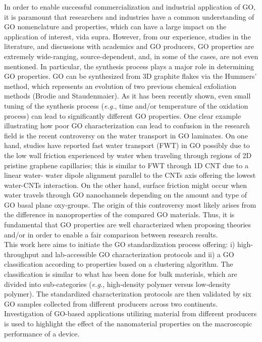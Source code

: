 In order to enable successful commercialization and industrial application of GO, it is paramount that researchers and industries have a common understanding of GO nomenclature and properties, which can have a large impact on the application of interest, vida supra. However, from our experience, studies in the literature, and discussions with academics and GO producers, GO properties are extremely wide-ranging, source-dependent, and, in some of the cases, are not even mentioned. In particular, the synthesis process plays a major role in determining GO properties. GO can be synthesized from 3D graphite flakes via the Hummers' method,\cite{Hummers1958} which represents an evolution of two previous chemical exfoliation methods (Brodie and Staudenmaier).\cite{Dreyer2010} As it has been recently shown, even small tuning of the synthesis process (\textit{e.g.}, time and/or temperature of the oxidation process) can lead to significantly different GO properties.\cite{chang2016guidelines} One clear example illustrating how poor GO characterization can lead to confusion in the research field is the recent controversy on the water transport in GO laminates. On one hand, studies have reported fast water transport (FWT) in GO possibly due to the low wall friction experienced by water when traveling through regions of 2D pristine graphene capillaries;\cite{nair2012unimpeded,abraham2017tunable} this is similar to FWT through 1D CNT due to a linear water- water dipole alignment parallel to the CNTs axis offering the lowest water-CNTs interaction.\cite{zuo2009transport} On the other hand, surface friction might occur when water travels through GO nanochannels depending on the amount and type of GO basal plane oxy-groups.\cite{willcox2017molecular,montessori2017extended,dai2016water,chen2017molecular} The origin of this controversy most likely arises from the difference in nanoproperties of the compared GO materials. Thus, it is fundamental that GO properties are well characterized when proposing theories and/or in order to enable a fair comparison between research results.\\
This work here aims to initiate the GO standardization process offering: i) high-throughput and lab-accessible GO characterization protocols and ii) a GO classification according to properties based on a clustering algorithm. The classification is similar to what has been done for bulk materials, which are divided into sub-categories (\textit{e.g.}, high-density polymer versus low-density polymer). The standardized characterization protocols are then validated by six GO samples collected from different producers across two continents. Investigation of GO-based applications utilizing material from different producers is used to highlight the effect of the nanomaterial properties on the macroscopic performance of a device.
